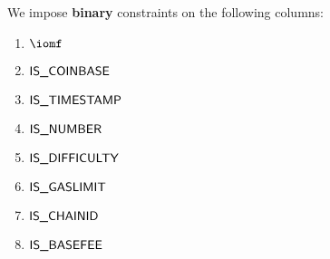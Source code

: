 We impose \textbf{binary} constraints on the following columns:
\begin{multicols}{3}
	\begin{enumerate}
		\item $\iomf$
		\item $\textsf{IS\_COINBASE}$
		\item $\textsf{IS\_TIMESTAMP}$
		\item $\textsf{IS\_NUMBER}$
		\item $\textsf{IS\_DIFFICULTY}$
		\item $\textsf{IS\_GASLIMIT}$
		\item $\textsf{IS\_CHAINID}$
		\item $\textsf{IS\_BASEFEE}$
	\end{enumerate}
\end{multicols}
